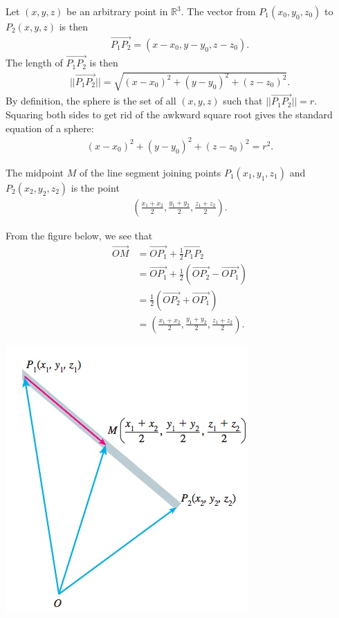 \documentclass[12pt,letterpaper,reqno]{article}
\numberwithin{equation}{section}
\begin{document}
{\color{red} 
Let $(x,y,z)$ be an arbitrary point in $\mathbb{R}^3$. The vector from $P_1(x_0,y_0,z_0)$ to $P_2(x,y,z)$ is then
\begin{align*}
	\overrightarrow{P_1P_2}=(x-x_0,y-y_0,z-z_0).
\end{align*}
The length of $\overrightarrow{P_1P_2}$ is then
\begin{align*}
	||\overrightarrow{P_1P_2}||=\sqrt{(x-x_0)^2+(y-y_0)^2+(z-z_0)^2}.
\end{align*}
By definition, the sphere is the set of all $(x,y,z)$ such that $||\overrightarrow{P_1P_2}||=r$. Squaring both sides to get rid of the awkward square root gives the standard equation of a sphere:
\begin{align*}
	(x-x_0)^2+(y-y_0)^2+(z-z_0)^2=r^2.
\end{align*}}

\begin{prop}
	The midpoint $M$ of the line segment joining points $P_1(x_1,y_1,z_1)$ and $P_2(x_2,y_2,z_2)$ is the point
	\begin{align*}
		\left(\frac{x_1+x_2}{2},\frac{y_1+y_2}{2},\frac{z_1+z_2}{2}\right).
	\end{align*}
\end{prop}

\begin{pf}
From the figure below, we see that
\begin{align*}
	\overrightarrow{OM}&=\overrightarrow{OP_1}+\frac{1}{2}\overrightarrow{P_1P_2} \\
	&=\overrightarrow{OP_1}+\frac{1}{2}(\overrightarrow{OP_2}-\overrightarrow{OP_1}) \\
	&=\frac{1}{2}(\overrightarrow{OP_2}+\overrightarrow{OP_1}) \\
	&=\left(\frac{x_1+x_2}{2},\frac{y_1+y_2}{2},\frac{z_1+z_2}{2}\right).
\end{align*}
\begin{center}
	\includegraphics[scale=0.5]{figures_mvc/midpoint_formula}
\end{center}	
\end{pf}
\end{document}
